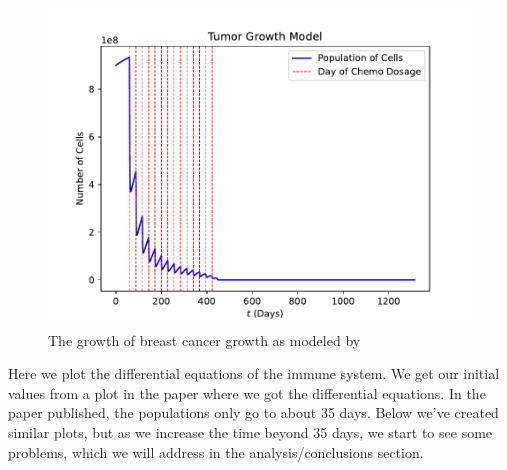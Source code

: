 \documentclass[11pt]{amsart}
\begin{document}
\begin{figure}[htb]
\begin{center} %
\includegraphics[width=\textwidth]{./images/image.pdf} %
\end{center}
\caption{The growth of breast cancer growth as modeled by
}
\label{fig:MeanSquaredError} %
\end{figure}

Here we plot the differential equations of the immune system. 
We get our initial values from a plot in the paper where we got the differential equations. 
In the paper published, the populations only go to about 35 days. 
Below we've created similar plots, but as we increase the time beyond 35 days, 
we start to see some problems, which we will address in the analysis/conclusions section.
\end{document}
